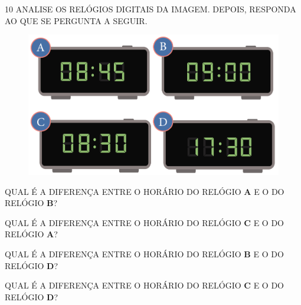 \pagebreak
\num{10} ANALISE OS RELÓGIOS DIGITAIS DA IMAGEM. DEPOIS, RESPONDA AO QUE SE PERGUNTA A SEGUIR.


\begin{figure}[htpb!]
\centering
\includegraphics[width=.5\textwidth]{../ilustracoes/MAT1/SAEB_1ANO_MAT_FIGURA56.png}
\end{figure}

\begin{escolha}
\item QUAL É A DIFERENÇA ENTRE O HORÁRIO DO RELÓGIO \textbf{A} E O DO RELÓGIO \textbf{B}?


\item QUAL É A DIFERENÇA ENTRE O HORÁRIO DO RELÓGIO \textbf{C} E O DO RELÓGIO \textbf{A}?


\item QUAL É A DIFERENÇA ENTRE O HORÁRIO DO RELÓGIO \textbf{B} E O DO RELÓGIO \textbf{D}?


\item QUAL É A DIFERENÇA ENTRE O HORÁRIO DO RELÓGIO \textbf{C} E O DO RELÓGIO \textbf{D}?

\end{escolha}




